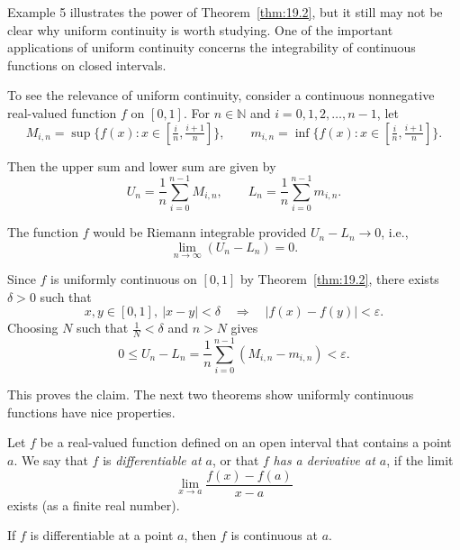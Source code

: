 \documentclass[12pt]{article}
\newenvironment{definitionbox}[1][]%
{\begin{tcolorbox}[definitionstyle,title={#1}]}%
{\end{tcolorbox}}
\newenvironment{theorembox}[1][]%
{\begin{tcolorbox}[theoremstyle,title={#1}]}%
{\end{tcolorbox}}
\begin{document}
\begin{definitionbox}[Discussion 19.3]
Example 5 illustrates the power of Theorem~\ref{thm:19.2}, but it still may  
not be clear why uniform continuity is worth studying. One of the important  
applications of uniform continuity concerns the integrability of continuous  
functions on closed intervals.

To see the relevance of uniform continuity, consider a continuous nonnegative  
real-valued function $f$ on $[0,1]$. For $n \in \mathbb{N}$ and  
$i = 0,1,2,\ldots,n-1$, let  
\[
M_{i,n} = \sup\{f(x) : x \in [\tfrac{i}{n}, \tfrac{i+1}{n}]\},  
\qquad
m_{i,n} = \inf\{f(x) : x \in [\tfrac{i}{n}, \tfrac{i+1}{n}]\}.
\]

Then the upper sum and lower sum are given by  
\[
U_n = \frac{1}{n} \sum_{i=0}^{n-1} M_{i,n},
\qquad
L_n = \frac{1}{n} \sum_{i=0}^{n-1} m_{i,n}.
\]

The function $f$ would be Riemann integrable provided $U_n - L_n \to 0$, i.e.,
\[
\lim_{n\to\infty}(U_n - L_n) = 0.
\]

Since $f$ is uniformly continuous on $[0,1]$ by Theorem~\ref{thm:19.2},  
there exists $\delta>0$ such that  
\[
x,y\in[0,1], \ |x-y|<\delta \quad\Rightarrow\quad |f(x)-f(y)|<\varepsilon.
\]
Choosing $N$ such that $\tfrac{1}{N}<\delta$ and $n>N$ gives
\[
0 \le U_n - L_n
  = \frac{1}{n} \sum_{i=0}^{n-1} (M_{i,n} - m_{i,n})
  < \varepsilon.
\]

This proves the claim. The next two theorems show uniformly continuous  
functions have nice properties.
\end{definitionbox}


\begin{definitionbox}[Definition 28.1 — Differentiability]
\label{def:28.1}
Let $f$ be a real-valued function defined on an open interval that contains a point $a$.  
We say that $f$ is \emph{differentiable at $a$}, or that $f$ \emph{has a derivative at $a$}, if the limit
\[
\lim_{x \to a} \frac{f(x)-f(a)}{x-a}
\]
exists (as a finite real number).
\end{definitionbox}

\begin{theorembox}[Theorem 28.2]
\label{thm:28.2}
If $f$ is differentiable at a point $a$, then $f$ is continuous at $a$.
\end{theorembox}
\end{document}
